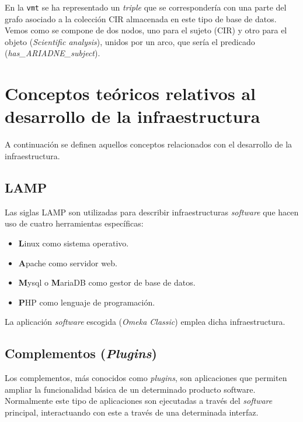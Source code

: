 \documentclass[
]{article}
\providecommand{\tightlist}{%
  \setlength{\itemsep}{0pt}\setlength{\parskip}{0pt}}
\begin{document}
En la \texttt{vmt} se ha representado un \emph{triple} que se
correspondería con una parte del grafo asociado a la colección CIR
almacenada en este tipo de base de datos. Vemos como se compone de dos
nodos, uno para el sujeto (CIR) y otro para el objeto (\emph{Scientific
analysis}), unidos por un arco, que sería el predicado
(\emph{has\_ARIADNE\_subject}).

\hypertarget{conceptos-teuxf3ricos-relativos-al-desarrollo-de-la-infraestructura}{%
\section{Conceptos teóricos relativos al desarrollo de la
infraestructura}\label{conceptos-teuxf3ricos-relativos-al-desarrollo-de-la-infraestructura}}

A continuación se definen aquellos conceptos relacionados con el
desarrollo de la infraestructura.

\hypertarget{lamp}{%
\subsection{LAMP}\label{lamp}}

Las siglas LAMP son utilizadas para describir infraestructuras
\emph{software} que hacen uso de cuatro herramientas específicas:

\begin{itemize}
\tightlist
\item
  \textbf{L}inux como sistema operativo.
\item
  \textbf{A}pache como servidor web.
\item
  \textbf{M}ysql o \textbf{M}ariaDB como gestor de base de datos.
\item
  \textbf{P}HP como lenguaje de programación.
\end{itemize}

La aplicación \emph{software} escogida (\emph{Omeka Classic}) emplea
dicha infraestructura.

\hypertarget{complementos-plugins}{%
\subsection{\texorpdfstring{Complementos
(\emph{Plugins})}{Complementos (Plugins)}}\label{complementos-plugins}}

Los complementos, más conocidos como \emph{plugins}, son aplicaciones
que permiten ampliar la funcionalidad básica de un determinado producto
software. Normalmente este tipo de aplicaciones son ejecutadas a través
del \emph{software} principal, interactuando con este a través de una
determinada interfaz.
\end{document}
